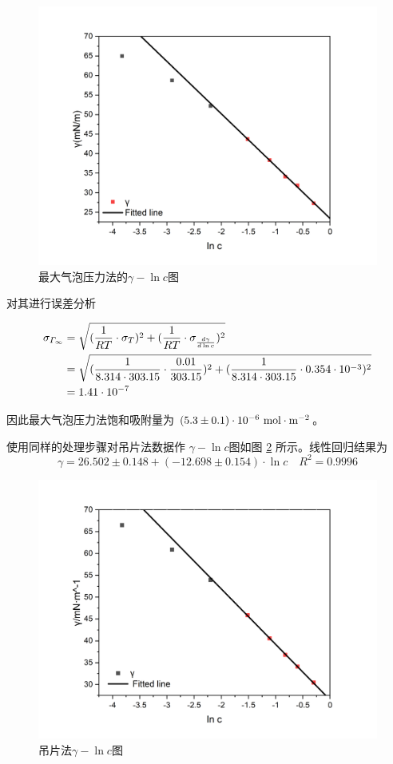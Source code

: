 \documentclass[cn,hazy,pku,12pt,normal,math=newtx,cite=super]{elegantnote}
\begin{document}
\begin{figure}[h]
    \centering
    \includegraphics[width = .65\textwidth]{image/Graph2.png}
    \caption{最大气泡压力法的$\gamma - \ln c$图}\label{7}
\end{figure}

对其进行误差分析

\begin{equation*}
    \begin{split}
    \rm \sigma_{\varGamma_\infty} 
    &= \sqrt{(\frac{1}{RT} \cdot \sigma_T)^2 + (\frac{1}{RT} \cdot \sigma_
    {\frac{d \gamma}{d \ln c}})^2} \\
    &= \sqrt{(\frac{1}{8.314 \cdot 303.15} \cdot \frac{0.01}{303.15})^2 + (\frac{1}{8.314 \cdot 303.15} \cdot 0.354 \cdot 10^{-3})^2}
    \\
    &= 1.41 \cdot 10^{-7}   
    \end{split}
\end{equation*}

因此最大气泡压力法饱和吸附量为 $(5.3 \pm 0.1) \cdot 10^{-6} {\rm\ mol \cdot m^{-2}}$。

使用同样的处理步骤对吊片法数据作 $\gamma - \ln c$图如图 \ref{8} 所示。线性回归结果为
$$
\gamma = 26.502 \pm 0.148 + ( - 12.698 \pm 0.154) \cdot \ln c
\quad R^2 = 0.9996
$$

\begin{figure}[h]
    \centering
    \includegraphics[width = .65\textwidth]{image/Graph4.png}
    \caption{吊片法$\gamma - \ln c$图}\label{8}
\end{figure}
\end{document}
